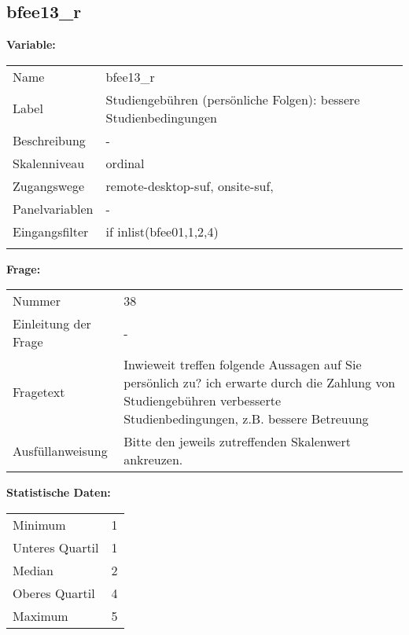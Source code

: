 	
	
	\subsection{bfee13\_r}
	\label{subSection:bfee13_r}

	\noindent\textbf{Variable:}\\
		\begin{tabular}{lL{11.3cm}}
			\label{tableVariable:bfee13_r}
			Name & bfee13\_r \\
			Label & Studiengebühren (persönliche Folgen): bessere Studienbedingungen \\
			Beschreibung & - \\
			Skalenniveau & ordinal \\
			Zugangswege &
				remote-desktop-suf,
				onsite-suf,
 \\
			Panelvariablen & -
			 \\
			Eingangsfilter & if inlist(bfee01,1,2,4) \\
 \\
		\end{tabular}

		\vspace*{1 cm}
		\noindent\textbf{Frage:}\\
		\begin{tabular}{lL{11.3cm}}
			\label{tableQuestion:bfee13_r}
			Nummer & 38 \\
			Einleitung der Frage & - \\
			Fragetext & Inwieweit treffen folgende Aussagen auf Sie persönlich zu?
ich erwarte durch die Zahlung von Studiengebühren verbesserte Studienbedingungen, z.B. bessere Betreuung \\
			Ausfüllanweisung & Bitte den jeweils zutreffenden Skalenwert ankreuzen. \\
		\end{tabular}


		\vspace*{1 cm}
		\noindent\textbf{Statistische Daten:}\\
			\begin{tabular}{ll}
				\label{tableStatistics:bfee13_r}
					Minimum & 1 \\
					Unteres Quartil & 1 \\
					Median & 2 \\
					Oberes Quartil & 4 \\
					Maximum & 5 \\
			\end{tabular}



